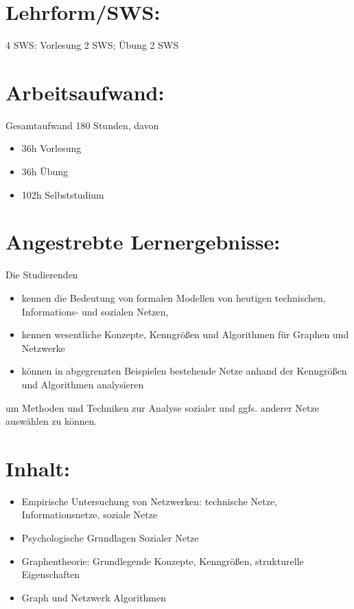 \section*{Lehrform/SWS:}\label{lehrformsws-11}

4 SWS: Vorlesung 2 SWS; Übung 2 SWS

\section*{Arbeitsaufwand:}\label{arbeitsaufwand-12}

Gesamtaufwand 180 Stunden, davon

\begin{itemize}
\tightlist
\item
  36h Vorlesung
\item
  36h Übung
\item
  102h Selbststudium
\end{itemize}

\section*{Angestrebte
Lernergebnisse:}\label{angestrebte-lernergebnisse-11}

Die Studierenden

\begin{itemize}
\tightlist
\item
  kennen die Bedeutung von formalen Modellen von heutigen technischen,
  Informations- und sozialen Netzen,
\item
  kennen wesentliche Konzepte, Kenngrößen und Algorithmen für Graphen
  und Netzwerke
\item
  können in abgegrenzten Beispielen bestehende Netze anhand der
  Kenngrößen und Algorithmen analysieren
\end{itemize}

um Methoden und Techniken zur Analyse sozialer und ggfs. anderer Netze
auswählen zu können.

\section*{Inhalt:}\label{inhalt-11}

\begin{itemize}
\tightlist
\item
  Empirische Untersuchung von Netzwerken: technische Netze,
  Informationsnetze, soziale Netze
\item
  Psychologische Grundlagen Sozialer Netze
\item
  Graphentheorie: Grundlegende Konzepte, Kenngrößen, strukturelle
  Eigenschaften
\item
  Graph und Netzwerk Algorithmen
\end{itemize}

